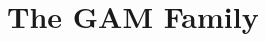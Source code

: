 \documentclass[11pt,aspectratio=169,hyperref={colorlinks}]{beamer}
\begin{document}
							
	\section{The GAM Family}
		\subsection*{}
\end{document}
